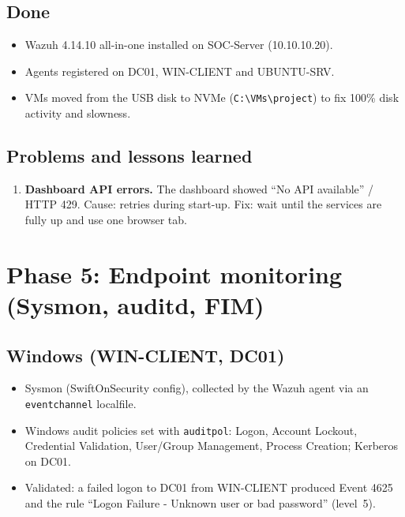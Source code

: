 \documentclass[11pt,a4paper]{article}
\begin{document}
\subsection{Done}
\begin{itemize}
  \item Wazuh 4.14.10 all-in-one installed on SOC-Server (10.10.10.20).
  \item Agents registered on DC01, WIN-CLIENT and UBUNTU-SRV.
  \item VMs moved from the USB disk to NVMe
        (\texttt{C:\textbackslash VMs\textbackslash project}) to fix 100\%
        disk activity and slowness.
\end{itemize}

\subsection{Problems and lessons learned}
\begin{enumerate}
  \item \textbf{Dashboard API errors.} The dashboard showed ``No API
        available'' / HTTP 429. Cause: retries during start-up. Fix: wait
        until the services are fully up and use one browser tab.
\end{enumerate}

\section{Phase 5: Endpoint monitoring (Sysmon, auditd, FIM)}

\subsection{Windows (WIN-CLIENT, DC01)}
\begin{itemize}
  \item Sysmon (SwiftOnSecurity config), collected by the Wazuh agent via an
        \texttt{eventchannel} localfile.
  \item Windows audit policies set with \texttt{auditpol}: Logon, Account
        Lockout, Credential Validation, User/Group Management, Process
        Creation; Kerberos on DC01.
  \item Validated: a failed logon to DC01 from WIN-CLIENT produced Event 4625
        and the rule ``Logon Failure - Unknown user or bad password''
        (level~5).
\end{itemize}
\end{document}
